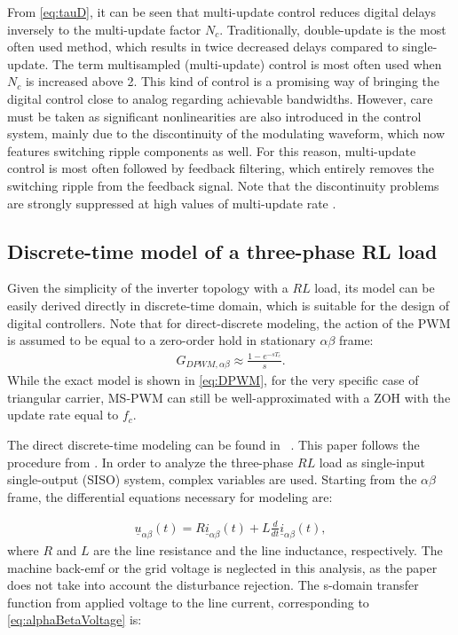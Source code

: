 \documentclass[conference]{IEEEtran}
\begin{document}
From \eqref{eq:tauD}, it can be seen that multi-update control reduces digital delays inversely to the multi-update factor $N_c$. Traditionally, double-update is the most often used method, which results in twice decreased delays compared to single-update.
The term multisampled (multi-update) control is most often used when $N_c$ is increased above 2. This kind of control is a promising way of bringing the digital control close to analog regarding achievable bandwidths. However, care must be taken as significant nonlinearities are also introduced in the control system, mainly due to the discontinuity of the modulating waveform, which now features switching ripple components as well. For this reason, multi-update control is most often followed by feedback filtering, which entirely removes the switching ripple from the feedback signal. Note that the discontinuity problems are strongly suppressed at high values of multi-update rate \cite{corradini2018}.

\subsection{Discrete-time model of a three-phase RL load}

Given the simplicity of the inverter topology with a $RL$ load, its model can be easily derived directly in discrete-time domain, which is suitable for the design of digital controllers. Note that for direct-discrete modeling, the action of the PWM is assumed to be equal to a zero-order hold in stationary $\alpha \beta$ frame:
\begin{equation}
\begin{aligned}
G_{DPWM,\alpha \beta} \approx \frac{1-e^{-sT_c}}{s}.
\label{eq:DPWMAlphaBeta} 
\end{aligned}    
\end{equation}
While the exact model is shown in \eqref{eq:DPWM}, for the very specific case of triangular carrier, MS-PWM can still be well-approximated with a ZOH with the update rate equal to $f_c$.

The direct discrete-time modeling can be found in ~\cite{lorenz2010,vuksa2016,commentsHoffmann}. This paper follows the procedure from \cite{commentsHoffmann}.
In order to analyze the three-phase $RL$ load as single-input single-output (SISO) system, complex variables are used. 
Starting from the $\alpha \beta$ frame, the differential equations necessary for modeling are:

\begin{equation}
\begin{aligned}
\underline{u}_{\alpha \beta} (t) = R \underline{i}_{\alpha \beta} (t) + L \frac{d}{dt} \underline{i}_{\alpha \beta} (t),
\label{eq:alphaBetaVoltage} 
\end{aligned}    
\end{equation}
where $R$ and $L$ are the line resistance and the line inductance, respectively. The machine back-emf or the grid voltage is neglected in this analysis, as the paper does not take into account the disturbance rejection.
The s-domain transfer function from applied voltage to the line current, corresponding to \eqref{eq:alphaBetaVoltage} is:
\end{document}
